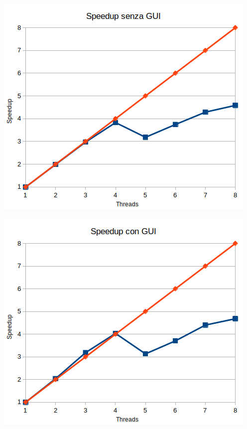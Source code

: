 \documentclass[12pt,a4paper,oneside]{article}
\begin{document}
	\hfill
	\begin{minipage}{.45\textwidth}
		\centering
		\includegraphics[width=\linewidth]{speedup-no-gui}
		\label{fig:speedup-no-gui}
	\end{minipage}
	\hfill
	\begin{minipage}{.45\textwidth}
		\centering
		\includegraphics[width=\linewidth]{speedup-gui}
		\label{fig:speedup-gui}
	\end{minipage}
	\hfill
	
\end{document}
